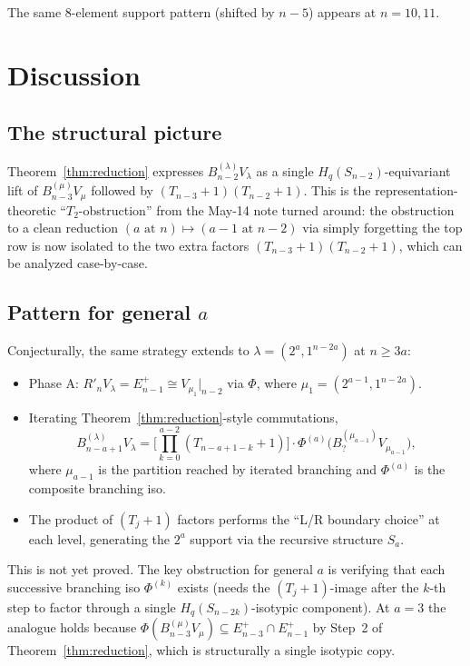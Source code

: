 \documentclass[11pt]{article}
\theoremstyle{definition}
\begin{document}
The same $8$-element support pattern (shifted by $n-5$) appears at
$n=10,11$.

\section{Discussion}\label{sec:discuss}

\subsection{The structural picture}

Theorem~\ref{thm:reduction} expresses $B_{n-2}^{(\lambda)}V_\lambda$
as a single $H_q(S_{n-2})$-equivariant lift of $B_{n-3}^{(\mu)}V_\mu$
followed by $(T_{n-3}{+}1)(T_{n-2}{+}1)$.  This is the
representation-theoretic ``$T_2$-obstruction'' from the May-14 note
turned around: the obstruction to a clean reduction
$(a\text{ at }n)\mapsto(a-1\text{ at }n-2)$ via simply forgetting
the top row is now isolated to the two extra factors
$(T_{n-3}{+}1)(T_{n-2}{+}1)$, which can be analyzed case-by-case.

\subsection{Pattern for general $a$}

Conjecturally, the same strategy extends to $\lambda=(2^a,1^{n-2a})$
at $n\ge 3a$:
\begin{itemize}[leftmargin=2em,topsep=0.3em,itemsep=0.2em]
\item Phase A: $R'_n V_\lambda=E_{n-1}^+\cong V_{\mu_1}|_{n-2}$ via
$\Phi$, where $\mu_1=(2^{a-1},1^{n-2a})$.
\item Iterating Theorem~\ref{thm:reduction}-style commutations,
\[
   B_{n-a+1}^{(\lambda)}V_\lambda
   = \big[\prod_{k=0}^{a-2}(T_{n-a+1-k}{+}1)\big]\cdot
   \Phi^{(a)}\big(B_?^{(\mu_{a-1})}V_{\mu_{a-1}}\big),
\]
where $\mu_{a-1}$ is the partition reached by iterated branching
and $\Phi^{(a)}$ is the composite branching iso.
\item The product of $(T_j{+}1)$ factors performs the ``L/R
boundary choice'' at each level, generating the $2^a$ support via
the recursive structure $S_a$.
\end{itemize}
This is not yet proved.  The key obstruction for general $a$ is
verifying that each successive branching iso $\Phi^{(k)}$ exists
(needs the $(T_j{+}1)$-image after the $k$-th step to factor
through a single $H_q(S_{n-2k})$-isotypic component).  At $a=3$
the analogue holds because $\Phi(B_{n-3}^{(\mu)}V_\mu)\subseteq
E_{n-3}^+\cap E_{n-1}^+$ by Step~2 of Theorem~\ref{thm:reduction},
which is structurally a single isotypic copy.
\end{document}
